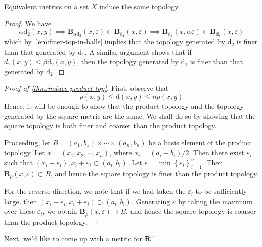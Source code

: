 \begin{lemma}
\label{lem:equiv-metric-equiv-top}
Equivalent metrics on a set \(X\) induce the same topology.
\end{lemma}
\begin{proof}
We have
\begin{equation*}
\alpha \mathrm{d_{2}}(x,y) \implies \mathbf{B}_{\alpha
\mathrm{d_{2}}}(x, \varepsilon) \subset
\mathbf{B}_{\mathrm{d_{1}}}(x, \varepsilon) \implies
\mathbf{B}_{\mathrm{d_{2}}}(x, \alpha \varepsilon) \subset
\mathbf{B}_{\mathrm{d_{1}}}(x, \varepsilon)
\end{equation*}
which by \cref{lem:finer-top-in-balls} implies that the topology generated by
\(\mathrm{d_{2}}\) is finer than that generated by \(\mathrm{d_{1}}\).
A similar argument shows that if \(d_{1}(x,y) \le \beta
\mathrm{d_{2}}(x,y)\), then the topology generated by \(\mathrm{d_{1}}\) is
finer than that generated by \(\mathrm{d_{2}}\).
\end{proof}
\begin{proof}[Proof of \cref{thm:induce-product-top}]
First, observe that
\begin{equation*}
\rho(x,y) \le \mathrm{d}(x,y) \le n \rho(x,y)
\end{equation*}
Hence, it will be enough to show that the product topology and the topology
generated by the square metric are the same. We shall do so by showing that
the square topology is both finer and coarser than the product topology.

Proceeding, let \(B = (a_{1}, b_{1}) \times \cdots \times (a_{n},
b_{n})\) be a basis element of the product topology. Let \(x  =
(x_{1}, x_{2}, \cdots, x_{n})\), where \(x_{i} =
(a_{i} + b_{i})/2\). Then there exist \(\varepsilon_{i}\) such that
\( (x_{i} - \varepsilon_{i}), x_{i} + \varepsilon_{i} \subset (a_{i},
b_{i})\). Let \(\varepsilon = \min\left\{ \varepsilon_{i}
\right\}_{i=1}^{n}\). Then \(\mathbf{B}_{\rho}(x, \varepsilon) \subset B\),
and hence the square topology is finer than the product topology.

For the reverse direction, we note that if we had taken the
\(\varepsilon_{i}\) to be sufficiently large, then
\( (x_{i} - \varepsilon_{i}, x_{i} + \varepsilon_{i}) \supset (a_{i},
b_{i})\). Generating \(\varepsilon\) by taking the maximum over these
\(\varepsilon_{i}\), we obtain \(\mathbf{B}_{\rho}(x, \varepsilon) \supset
B\), and hence the square topology is coarser than the product topology.
\end{proof}
Next, we'd like to come up with a metric for \( \mathbf{R}^{\omega} \).
